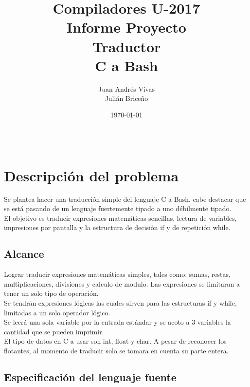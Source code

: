 \documentclass[aspectratio=169]{article}
\title{Compiladores U-2017 \\ Informe Proyecto \\ Traductor \\ C a Bash} %
\author{Juan Andr\'es Vivas\\
		Juli\'an Brice\~no} %
\date{\today} %
\begin{document}
\maketitle %

\begin{center}
\begin{tabular}{l r}

\end{tabular}
\end{center}

\newpage

\section{Descripci\'on del problema}

	Se plantea hacer una traducci\'on simple del lenguaje C a Bash, cabe destacar que se est\'a
	pasando de un lenguaje fuertemente tipado a uno débilmente tipado.\\

	El objetivo es traducir expresiones matem\'aticas sencillas, lectura de variables, impresiones
	por pantalla y la estructura de decisión if y de repetición while.

\subsection{Alcance}

	Lograr traducir expresiones matem\'aticas simples, tales como: sumas, restas, multiplicaciones,
	divisiones y calculo de modulo. Las expresiones se limitaran a tener un solo tipo de operaci\'on. \\

	Se tendrán expresiones l\'ogicas las cuales sirven para las estructuras if y while, limitadas a un
	solo operador l\'ogico.\\

	Se leerá una sola variable por la entrada estándar y se acoto a 3 variables la cantidad que se pueden
	imprimir.\\

	El tipo de datos en C a usar son int, float y char. A pesar de reconocer los flotantes, al momento de traducir
	solo se tomara en cuenta su parte entera.

\subsection{Especificaci\'on del lenguaje fuente}
\end{document}
